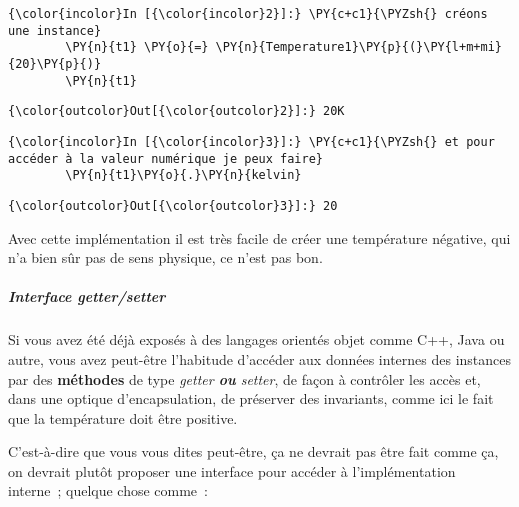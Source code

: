     \begin{Verbatim}[commandchars=\\\{\}]
{\color{incolor}In [{\color{incolor}2}]:} \PY{c+c1}{\PYZsh{} créons une instance}
        \PY{n}{t1} \PY{o}{=} \PY{n}{Temperature1}\PY{p}{(}\PY{l+m+mi}{20}\PY{p}{)}
        \PY{n}{t1}
\end{Verbatim}


\begin{Verbatim}[commandchars=\\\{\}]
{\color{outcolor}Out[{\color{outcolor}2}]:} 20K
\end{Verbatim}
            
    \begin{Verbatim}[commandchars=\\\{\}]
{\color{incolor}In [{\color{incolor}3}]:} \PY{c+c1}{\PYZsh{} et pour accéder à la valeur numérique je peux faire}
        \PY{n}{t1}\PY{o}{.}\PY{n}{kelvin}
\end{Verbatim}


\begin{Verbatim}[commandchars=\\\{\}]
{\color{outcolor}Out[{\color{outcolor}3}]:} 20
\end{Verbatim}
            
    Avec cette implémentation il est très facile de créer une température
négative, qui n'a bien sûr pas de sens physique, ce n'est pas bon.

    \hypertarget{interface-gettersetter}{%
\subparagraph{\texorpdfstring{Interface
\emph{getter/setter}}{Interface getter/setter}}\label{interface-gettersetter}}

    Si vous avez été déjà exposés à des langages orientés objet comme C++,
Java ou autre, vous avez peut-être l'habitude d'accéder aux données
internes des instances par des \textbf{méthodes} de type
\emph{getter\textbf{ ou }setter}, de façon à contrôler les accès et,
dans une optique d'encapsulation, de préserver des invariants, comme ici
le fait que la température doit être positive.

C'est-à-dire que vous vous dites peut-être, ça ne devrait pas être fait
comme ça, on devrait plutôt proposer une interface pour accéder à
l'implémentation interne~; quelque chose comme~:

